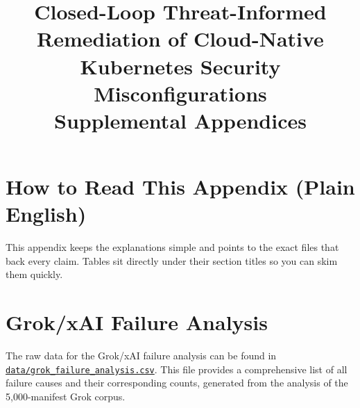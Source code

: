 \documentclass[10pt]{article}
\begin{document}
\title{Closed-Loop Threat-Informed\\Remediation of Cloud-Native\\Kubernetes Security Misconfigurations\\Supplemental Appendices}
\date{}
\maketitle

\sloppy

\appendix
\section*{How to Read This Appendix (Plain English)}
This appendix keeps the explanations simple and points to the exact files that back every claim. Tables sit directly under their section titles so you can skim them quickly.

\section{Grok/xAI Failure Analysis}
\label{app:grok_failures}
The raw data for the Grok/xAI failure analysis can be found in \href{https://github.com/bmendonca3/k8s-auto-fix/blob/tcc-2025-12-0666-packet-2026-05-31/data/grok_failure_analysis.csv}{\texttt{data/grok\_failure\_analysis.csv}}. This file provides a comprehensive list of all failure causes and their corresponding counts, generated from the analysis of the 5,000-manifest Grok corpus.
\end{document}
